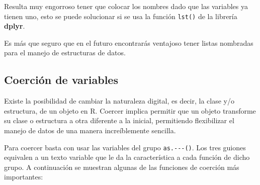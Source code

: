 \documentclass[
]{article}
\newenvironment{Shaded}{\begin{snugshade}}{\end{snugshade}}
\newcommand{\CommentTok}[1]{\textcolor[rgb]{0.56,0.35,0.01}{\textit{#1}}}
\newcommand{\FunctionTok}[1]{\textcolor[rgb]{0.00,0.00,0.00}{#1}}
\newcommand{\NormalTok}[1]{#1}
\newcommand{\OtherTok}[1]{\textcolor[rgb]{0.56,0.35,0.01}{#1}}
\newcommand{\SpecialCharTok}[1]{\textcolor[rgb]{0.00,0.00,0.00}{#1}}
\theoremstyle{definition}
\theoremstyle{definition}
\theoremstyle{definition}
\theoremstyle{definition}
\theoremstyle{remark}
\begin{document}
Resulta muy engorroso tener que colocar los nombres dado que las variables ya tienen uno, esto se puede solucionar si se usa la función \texttt{lst()} de la librería \textbf{dplyr}.

\begin{Shaded}
\end{Shaded}

Es más que seguro que en el futuro encontrarás ventajoso tener listas nombradas para el manejo de estructuras de datos.

\hypertarget{coerciuxf3n-de-variables}{%
\subsection{Coerción de variables}\label{coerciuxf3n-de-variables}}

Existe la posibilidad de cambiar la naturaleza digital, es decir, la clase y/o estructura, de un objeto en R. Coercer implica permitir que un objeto transforme su clase o estructura a otra diferente a la inicial, permitiendo flexibilizar el manejo de datos de una manera increíblemente sencilla.

Para coercer basta con usar las variables del grupo \texttt{as.-\/-\/-()}. Los tres guiones equivalen a un texto variable que le da la característica a cada función de dicho grupo. A continuación se muestran algunas de las funciones de coerción más importantes:
\end{document}
